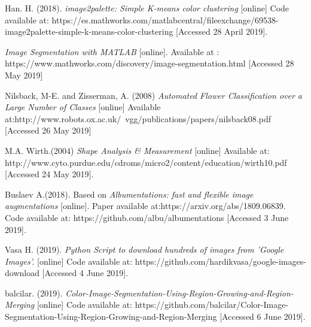 \documentclass[11]{article}
\begin{document}
\newpage
\begin{thebibliography}{100}
	Han. H. (2018). \textit{image2palette: Simple K-means color clustering} [online] Code available at: https://es.mathworks.com/matlabcentral/fileexchange/69538-image2palette-simple-k-means-color-clustering [Accessed 28 April 2019].

\textit{Image Segmentation with MATLAB} [online]. Available at : https://www.mathworks.com/discovery/image-segmentation.html [Accessed 28 May 2019]

Nilsback, M-E. and Zisserman, A. (2008) \textit{Automated Flower Classification over a Large Number of Classes} [online] Available at:http://www.robots.ox.ac.uk/~vgg/publications/papers/nilsback08.pdf [Accessed 26 May 2019]


M.A. Wirth.(2004) \textit{Shape Analysis \& Measurement} [online] Available at: http://www.cyto.purdue.edu/cdroms/micro2/content/education/wirth10.pdf [Accessed 24 May 2019].

    Buslaev A.(2018). Based on \textit{Albumentations: fast and flexible image augmentations} [online]. Paper available at:https://arxiv.org/abs/1809.06839. Code available at: https://github.com/albu/albumentations  [Accessed 3 June 2019].


    Vasa H. (2019). \textit{Python Script to download hundreds of images from 'Google Images'.} [online] Code available at: https://github.com/hardikvasa/google-images-download [Accessed 4 June 2019].

	balcilar. (2019). \textit{Color-Image-Segmentation-Using-Region-Growing-and-Region-Merging} [online] Code available at: https://github.com/balcilar/Color-Image-Segmentation-Using-Region-Growing-and-Region-Merging [Accessed 6 June 2019].







\end{thebibliography}
\end{document}
